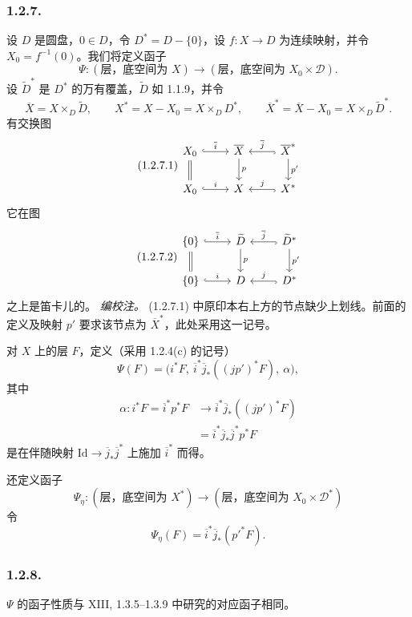 \subsubsection*{1.2.7.}
设 $D$ 是圆盘，$0\in D$，令 $D^*=D-\{0\}$，设 $f:X\longrightarrow D$ 为连续映射，并令 $X_0=f^{-1}(0)$。我们将定义函子
\[
\Psi:(\text{层，底空间为 }X)
\longrightarrow(\text{层，底空间为 }X_0\times\mathcal D).
\]
设 $\widetilde D^*$ 是 $D^*$ 的万有覆盖，$\widetilde D$ 如 1.1.9，并令
\[
\overline X=X\times_D\widetilde D,
\qquad
X^*=X-X_0=X\times_DD^*,
\qquad
\overline X^*=\overline X-X_0=X\times_D\widetilde D^*.
\]
有交换图
\begin{equation}\tag{1.2.7.1}
\begin{tikzcd}
X_0 \arrow[r, hook, "\overline i"] \arrow[d, equal]
  & \overline X \arrow[d, "p"]
  & \overline X^* \arrow[l, hook, "\overline j"']
      \arrow[d, "p'"] \\
X_0 \arrow[r, hook, "i"]
  & X
  & X^* \arrow[l, hook, "j"']
\end{tikzcd}
\end{equation}
它在图
\begin{equation}\tag{1.2.7.2}
\begin{tikzcd}
\{0\} \arrow[r, hook, "\overline i"] \arrow[d, equal]
  & \widetilde D \arrow[d, "p"]
  & \widetilde D^* \arrow[l, hook, "\overline j"']
      \arrow[d, "p'"] \\
\{0\} \arrow[r, hook, "i"]
  & D
  & D^* \arrow[l, hook, "j"']
\end{tikzcd}
\end{equation}
之上是笛卡儿的。
\noindent\emph{编校注。} (1.2.7.1) 中原印本右上方的节点缺少上划线。前面的定义及映射 $p'$ 要求该节点为 $\overline X^*$，此处采用这一记号。

对 $X$ 上的层 $F$，定义（采用 1.2.4(c) 的记号）
\[
\Psi(F)=
\bigl(i^*F,\ \overline i^*\overline j_*((jp')^*F),\ \alpha\bigr),
\]
其中
\[
\begin{split}
\alpha:i^*F=\overline i^*p^*F
&\longrightarrow
\overline i^*\overline j_*((jp')^*F)\\
&=\overline i^*\overline j_*\overline j^*p^*F
\end{split}
\]
是在伴随映射 $\mathrm{Id}\longrightarrow\overline j_*\overline j^*$ 上施加 $\overline i^*$ 而得。

还定义函子
\[
\Psi_\eta:(\text{层，底空间为 }X^*)
\longrightarrow(\text{层，底空间为 }X_0\times\mathcal D^*)
\]
令
\[
\Psi_\eta(F)=\overline i^*\overline j_*({p'}^*F).
\]

\subsubsection*{1.2.8.}
$\Psi$ 的函子性质与 XIII, 1.3.5--1.3.9 中研究的对应函子相同。

